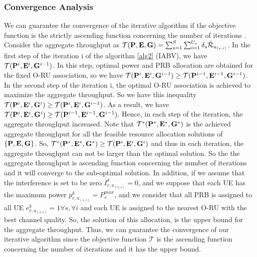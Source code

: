 \documentclass[lettersize,journal]{IEEEtran}
\begin{document}
\subsubsection{Convergence Analysis}
We can guarantee the convergence of the iterative algorithm if the objective function is the strictly ascending function concerning the number of iterations \cite{gholipoor2020resource}.
Consider the aggregate throughput as $\mathcal{T(\bold{P},\bold{E},\bold{G})} =\sum_{s=1}^{S}\sum_{i=1}^{U_s}\delta_s \bar{\mathcal{R}}_{u_{(s,i)}}$. 
In the first step of the iteration i of the algorithm \ref{alg2} (IABV), we have $\mathcal{T}(\bold{P}^{i},\bold{E}^i,\bold{G}^{i-1})$.
In this step, optimal power and PRB allocation are obtained for the fixed O-RU association, so we have
$\mathcal{T}(\bold{P}^{i},\bold{E}^i,\bold{G}^{i-1}) \geq \mathcal{T}(\bold{P}^{i-1},\bold{E}^{i-1},\bold{G}^{i-1})$.
In the second step of the iteration i, the optimal O-RU association is achieved to maximize the aggregate throughput. So we have this inequality
$\mathcal{T}(\bold{P}^{i},\bold{E}^i,\bold{G}^{i}) \geq \mathcal{T}(\bold{P}^{i},\bold{E}^{i},\bold{G}^{i-1})$.
As a result, we have 
$\mathcal{T}(\bold{P}^{i},\bold{E}^i,\bold{G}^{i}) \geq \mathcal{T}(\bold{P}^{i-1},\bold{E}^{i-1},\bold{G}^{i-1})$.
Hence, in each step of the iteration, the aggregate throughput increased.
Note that $\mathcal{T}^*(\bold{P}^{*},\bold{E}^*,\bold{G}^{*})$ is the achieved aggregate throughput 
for all the feasible resource allocation solutions of $\{\bold{P},\bold{E},\bold{G}\}$.
So, $\mathcal{T}^*(\bold{P}^{*},\bold{E}^*,\bold{G}^{*}) \geq \mathcal{T}(\bold{P}^{i},\bold{E}^i,\bold{G}^{i})$ and thus in each iteration, the aggregate throughput can not be larger than the optimal solution.
So the the aggregate throughput is ascending function concerning the number of iterations and it will converge to the sub-optimal solution.
In addition, if we assume that the interference is set to be zero ${I}_{r,u_{(s,i)}}^{k}=0$,
and we suppose that each UE has the maximum power $p_{r,u_{(s,i)}}^k = P_{s}^{max}$,
and we consider that all PRB is assigned to all UE $e_{r,u_{(s,i)}}^k = 1 \forall s,\forall i$
and each UE is assigned to the nearest O-RU with the best channel quality. So, the solution of this allocation, is the upper bound 
for the aggregate throughput. Thus,
we can guarantee the convergence of our iterative algorithm since the objective function $\mathcal{T}$ is the ascending function concerning the number of iterations
 and it has the upper bound.
\end{document}
